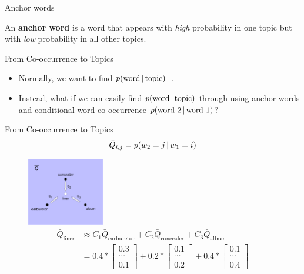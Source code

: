 \begin{frame}{Anchor words}
\begin{definition}
An \textbf{anchor word} is a word that appears with \emph{high} probability in one topic but with \emph{low} probability in all other topics.
\end{definition}
\end{frame}

\begin{frame}{From Co-occurrence to Topics}
\begin{itemize}
\item Normally, we want to find \(p(\text{word} \, | \, \text{topic}) \)~\cite{blei-2003}.
\item Instead, what if we can easily find \(p(\text{word} \, | \, \text{topic})\) through using anchor words and conditional word co-occurrence \(p(\text{word 2} \, | \, \text{word 1})\)?
\end{itemize}
\end{frame}


\begin{frame}{From Co-occurrence to Topics}
\begin{equation*}
\bar{Q}_{i,j} = p(w_2 = j \, | \, w_1 = i)
\end{equation*}
\begin{figure}
\includegraphics[width=0.3\textwidth]{topic_models/mtanchor/combination} 
\begin{align*}
\bar{Q}_{\text{liner}} &\approx C_1 \bar{Q}_{\text{carburetor}} + C_2 \bar{Q}_{\text{concealer}} + C_3 \bar{Q}_{\text{album}} \\
&= 0.4 * \begin{bmatrix} 0.3 \\ \cdots \\ 0.1 \end{bmatrix} + 0.2 * \begin{bmatrix} 0.1 \\ \cdots \\ 0.2 \end{bmatrix} + 0.4 * \begin{bmatrix} 0.1 \\ \cdots \\ 0.4 \end{bmatrix} 
\end{align*}
\end{figure}
\end{frame}



